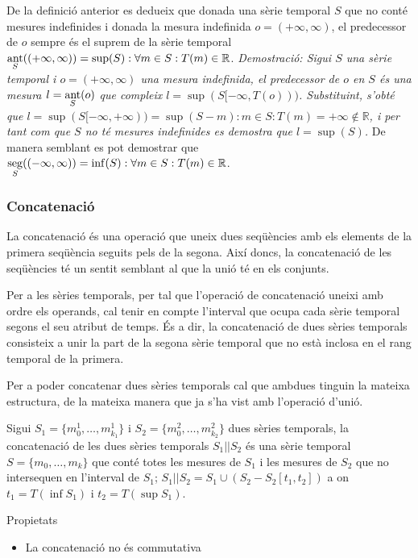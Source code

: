 De la definició anterior es dedueix que donada una sèrie temporal $S$
que no conté mesures indefinides i donada la mesura indefinida
$o=(+\infty,\infty)$, el predecessor de $o$ sempre és el suprem de la
sèrie temporal $\operatorname*{ant}\limits_S( (+\infty,\infty) ) = \sup(S): \forall
m\in S: T(m)\in\mathbb{R}$.  %
\emph{Demostració: Sigui $S$ una sèrie temporal i $o=(+\infty,\infty)$
  una mesura indefinida, el predecessor de $o$ en $S$ és una mesura
  $l=\operatorname*{ant}\limits_S(o)$ que compleix
  $l=\sup(S[-\infty,T(o)))$. Substituint, s'obté que
  $l=\sup(S[-\infty,+\infty))=\sup(S-m):m\in S:T(m)=+\infty \notin
  \mathbb{R}$, i per tant com que $S$ no té mesures indefinides es
  demostra que $l=\sup(S)$.  } De manera semblant es pot demostrar que
$\operatorname*{seg}\limits_S( (-\infty,\infty) ) = \inf(S): \forall m\in S:
T(m)\in\mathbb{R}$.


\subsubsection{Concatenació}

La concatenació és una operació que uneix dues seqüències amb els
elements de la primera seqüència seguits pels de la segona. Així
doncs, la concatenació de les seqüències té un sentit semblant al que
la unió té en els conjunts. 

Per a les sèries temporals, per tal que l'operació de concatenació
uneixi amb ordre els operands, cal tenir en compte l'interval que
ocupa cada sèrie temporal segons el seu atribut de temps.  És a dir,
la concatenació de dues sèries temporals consisteix a unir la part de
la segona sèrie temporal que no està inclosa en el rang temporal de la
primera.

Per a poder concatenar dues sèries temporals cal que ambdues tinguin
la mateixa estructura, de la mateixa manera que ja s'ha vist amb
l'operació d'unió.


\begin{definition}[concatenació]
  Sigui $S_1=\{m_0^1, \dotsc, m_{k_1}^1\}$ i $S_2=\{m_0^2, \dotsc,
  m_{k_2}^2\}$ dues sèries temporals, la concatenació de les dues
  sèries temporals $S_1 || S_2$ és una sèrie temporal $S=\{m_0,
  \dotsc, m_k\}$ que conté totes les mesures de $S_1$ i les mesures de
  $S_2$ que no intersequen en l'interval de $S_1$; $S_1 || S_2 = S_1
  \cup ( S_2 - S_2[t_1,t_2] )$ a on $t_1=T(\inf S_1)$ i $t_2=T(\sup
  S_1)$.
\end{definition}

Propietats
\begin{itemize}
\item La concatenació no és commutativa
\end{itemize}







